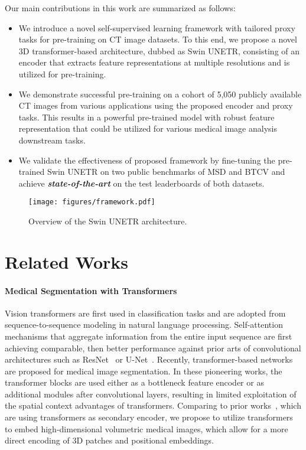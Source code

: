 \documentclass[10pt,twocolumn,letterpaper]{article}
\begin{document}
Our main contributions in this work are summarized as follows: 
\begin{itemize}
\item We introduce a novel self-supervised learning framework with tailored proxy tasks for pre-training on CT image datasets. To this end, we propose a novel 3D transformer-based architecture, dubbed as Swin UNETR, consisting of an encoder that extracts feature representations at multiple resolutions and is utilized for pre-training.
\item We demonstrate successful pre-training on a cohort of 5,050 publicly available CT images from various applications using the proposed encoder and proxy tasks. This results in a powerful pre-trained model with robust feature representation that could be utilized for various medical image analysis downstream tasks.   
\item We validate the effectiveness of proposed framework by fine-tuning the pre-trained Swin UNETR on two public benchmarks of MSD and BTCV and achieve \emph{\textbf{state-of-the-art}} on the test leaderboards of both datasets.
\end{itemize}

\begin{figure*}[t]
\centering
\texttt{[image: figures/framework.pdf]}
\caption{Overview of the Swin UNETR architecture.}
  \label{fig:fig2}
\end{figure*}
\section{Related Works}
\label{sec:formatting}

\paragraph{Medical Segmentation with Transformers}
Vision transformers are first used in classification tasks and are adopted from sequence-to-sequence modeling in natural language processing. Self-attention mechanisms that aggregate information from the entire input sequence are first achieving comparable, then better performance against prior arts of convolutional architectures such as ResNet~\cite{he2016deep} or U-Net~\cite{cciccek20163d}. Recently, transformer-based networks~\cite{xie2021cotr, zhou2021nnformer, jose2021medical, xu2021levit} are proposed for medical image segmentation. In these pioneering works, the transformer blocks are used either as a bottleneck feature encoder or as additional modules after convolutional layers, resulting in limited exploitation of the spatial context advantages of transformers. Comparing to prior works~\cite{chen2021transunet, xie2021cotr}, which are using transformers as secondary encoder, we propose to utilize transformers to embed high-dimensional volumetric medical images, which allow for a more direct encoding of 3D patches and positional embeddings. 
\end{document}
